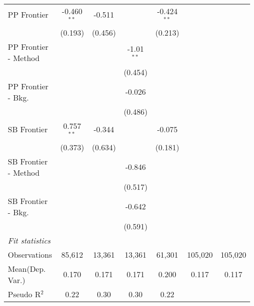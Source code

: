 \begin{tabular}{lcccccc}
   PP Frontier          & -0.460$^{**}$ & -0.511        &               & -0.424$^{**}$ &         &   \\   
                        & (0.193)       & (0.456)       &               & (0.213)       &         &   \\   
   PP Frontier - Method &               &               & -1.01$^{**}$  &               &         &   \\   
                        &               &               & (0.454)       &               &         &   \\   
   PP Frontier - Bkg.   &               &               & -0.026        &               &         &   \\   
                        &               &               & (0.486)       &               &         &   \\   
   SB Frontier          & 0.757$^{**}$  & -0.344        &               & -0.075        &         &   \\   
                        & (0.373)       & (0.634)       &               & (0.181)       &         &   \\   
   SB Frontier - Method &               &               & -0.846        &               &         &   \\   
                        &               &               & (0.517)       &               &         &   \\   
   SB Frontier - Bkg.   &               &               & -0.642        &               &         &   \\   
                        &               &               & (0.591)       &               &         &   \\   
   \midrule
   \emph{Fit statistics}\\
   Observations         & 85,612        & 13,361        & 13,361        & 61,301        & 105,020 & 105,020\\  
Mean(Dep. Var.) & 0.170 & 0.171 & 0.171 & 0.200 & 0.117 & 0.117 \\
   Pseudo R$^2$         & 0.22          & 0.30          & 0.30          & 0.22          &         & \\  
   

\end{tabular}
